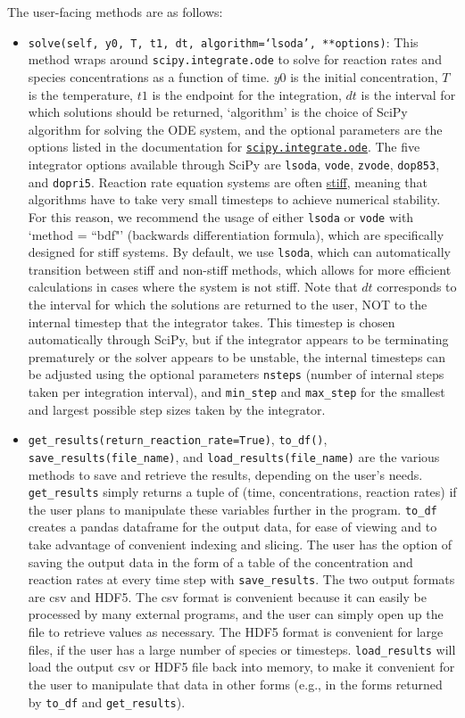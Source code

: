 \documentclass[12pt]{article}
\begin{document}
The user-facing methods are as follows: 
\begin{itemize}
\item \texttt{solve(self, y0, T, t1, dt, algorithm=`lsoda', **options)}: This method wraps around \texttt{scipy.integrate.ode} to solve for reaction rates and species concentrations as a function of time. $y0$ is the initial concentration, $T$ is the temperature, $t1$ is the endpoint for the integration, $dt$ is the interval for which solutions should be returned, `algorithm' is the choice of SciPy algorithm for solving the ODE system, and the optional parameters are the options listed in the documentation for \href{https://docs.scipy.org/doc/scipy/reference/generated/scipy.integrate.ode.html}{\texttt{scipy.integrate.ode}}. The five integrator options available through SciPy are \texttt{lsoda}, \texttt{vode}, \texttt{zvode}, \texttt{dop853}, and \texttt{dopri5}. Reaction rate equation systems are often \href{https://www.mathworks.com/help/matlab/math/solve-stiff-odes.html}{stiff}, meaning that algorithms have to take very small timesteps to achieve numerical stability. For this reason, we recommend the usage of either \texttt{lsoda} or \texttt{vode} with `method = ``bdf"' (backwards differentiation formula), which are specifically designed for stiff systems. By default, we use \texttt{lsoda}, which can automatically transition between stiff and non-stiff methods, which allows for more efficient calculations in cases where the system is not stiff. Note that $dt$ corresponds to the interval for which the solutions are returned to the user, NOT to the internal timestep that the integrator takes. This timestep is chosen automatically through SciPy, but if the integrator appears to be terminating prematurely or the solver appears to be unstable, the internal timesteps can be adjusted using the optional parameters \texttt{nsteps} (number of internal steps taken per integration interval), and \texttt{min\_step} and \texttt{max\_step} for the smallest and largest possible step sizes taken by the integrator. 
\item \texttt{get\_results(return\_reaction\_rate=True)}, \texttt{to\_df()}, \texttt{save\_results(file\_name)}, and \texttt{load\_results(file\_name)} are the various methods to save and retrieve the results, depending on the user's needs. \texttt{get\_results} simply returns a tuple of (time, concentrations, reaction rates) if the user plans to manipulate these variables further in the program. \texttt{to\_df} creates a pandas dataframe for the output data, for ease of viewing and to take advantage of convenient indexing and slicing. The user has the option of saving the output data in the form of a table of the concentration and reaction rates at every time step with \texttt{save\_results}. The two output formats are csv and HDF5. The csv format is convenient because it can easily be processed by many external programs, and the user can simply open up the file to retrieve values as necessary. The HDF5 format is convenient for large files, if the user has a large number of species or timesteps. \texttt{load\_results} will load the output csv or HDF5 file back into memory, to make it convenient for the user to manipulate that data in other forms (e.g., in the forms returned by \texttt{to\_df} and \texttt{get\_results}). 

\end{itemize}
\end{document}
